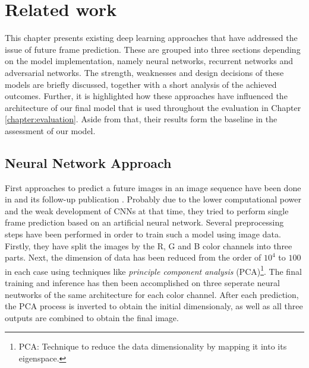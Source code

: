 
\chapter{Related work}  \label{chapter:relatedwork}

This chapter presents existing deep learning approaches that have addressed the issue of future frame prediction. These are grouped into three sections depending on the model implementation, namely neural networks, recurrent networks and adversarial networks. The strength, weaknesses and design decisions of these models are briefly discussed, together with a short analysis of the achieved outcomes. Further, it is highlighted how these approaches have influenced the architecture of our final model that is used throughout the evaluation in Chapter \ref{chapter:evaluation}. Aside from that, their results form the baseline in the assessment of our model.


\section{Neural Network Approach}

First approaches to predict a future images in an image sequence have been done in \parencite{ann} and its follow-up publication \parencite{ann2}. Probably due to the lower computational power and the weak development of CNNs at that time, they tried to perform single frame prediction based on an artificial neural network. Several preprocessing steps have been performed in order to train such a model using image data. Firstly, they have split the images by the R, G and B color channels into three parts. Next, the dimension of data has been reduced from the order of $10^4$ to $100$ in each case using techniques like \textit{principle component analysis} (PCA)\footnote{PCA: Technique to reduce the data dimensionality by mapping it into its eigenspace.}. The final training and inference has then been accomplished on three seperate neural neutworks of the same architecture for each color channel. After each prediction, the PCA process is inverted to obtain the initial dimensionaly, as well as all three outputs are combined to obtain the final image.


